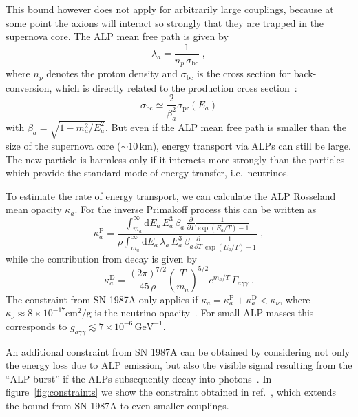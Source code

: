 \documentclass[11pt,a4paper]{article}
\newcommand{\ga}{g_{a\gamma\gamma}}
\begin{document}
This bound however does not apply for arbitrarily large couplings, because at some point the axions will interact so strongly that they are trapped in the supernova core. The ALP mean free path is given by
\begin{equation}
\lambda_a=\frac{1}{n_p \, \sigma_\text{bc}} \; ,
\end{equation}
where $n_p$ denotes the proton density and $\sigma_\text{bc}$ is the cross section for back-conversion, which is directly related to the production cross section~\cite{Brockway:1996yr}:
\begin{equation}
 \sigma_\text{bc} \simeq \frac{2}{\beta_a^2} \sigma_\text{pr}(E_a)
\end{equation}
with $\beta_a = \sqrt{1 - m_a^2/E_a^2}$. But even if the ALP mean free path is smaller than the size of the supernova core ($\sim 10\,\text{km}$), energy transport via ALPs can still be large. The new particle is harmless only if it interacts more strongly than the particles which provide the standard mode of energy transfer, i.e.\ neutrinos.

To estimate the rate of energy transport, we can calculate the ALP Rosseland mean opacity $\kappa_a$. For the inverse Primakoff process this can be written as~\cite{Raffelt:1996wa}
\begin{equation}
\kappa_{a}^\text{P} = \frac{\int_{m_a}^{\infty}  \mathrm{d}E_a \, E_a^3 \, \beta_a \, \frac{\partial}{\partial T}\frac{1}{\exp(E_a/T)-1}}{ \rho \int_{m_a}^{\infty}  \mathrm{d}E_a \, \lambda_a \, E_a^3 \, \beta_a  \frac{\partial}{\partial T}\frac{1}{\exp(E_a/T)-1} } \; ,
\end{equation}
while the contribution from decay is given by~\cite{Raffelt:1988rx}
\begin{equation}
\kappa_a^\text{D} = \frac{(2\pi)^{7/2}}{45 \, \rho}\left(\frac{T}{m_a}\right)^{5/2} e^{m_a/T} \, \Gamma_{a\gamma\gamma} \; .
\end{equation}
The constraint from SN 1987A only applies if $\kappa_a=\kappa_a^\text{P}+\kappa_a^\text{D} < \kappa_\nu$, where $\kappa_\nu \approx 8 \times 10^{-17} \mathrm{cm^2/g}$ is the neutrino opacity~\cite{Masso:1995tw}. For small ALP masses this corresponds to $\ga \lesssim 7 \times 10^{-6}\,\mathrm{GeV^{-1}}$.

An additional constraint from SN 1987A can be obtained by considering not only the energy loss due to ALP emission, but also the visible signal resulting from the ``ALP burst'' if the ALPs subsequently decay into photons~\cite{Jaeckel:2017tud}. In figure~\ref{fig:constraints} we show the constraint obtained in ref.~\cite{Jaeckel:2017tud}, which extends the bound from SN 1987A to even smaller couplings.
\end{document}
